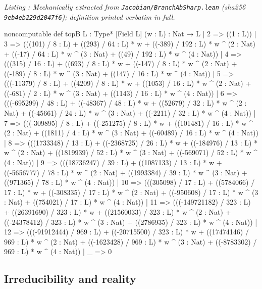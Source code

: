 \documentclass[a4paper,11pt]{article}
\newcounter{leanlisting}
\newenvironment{leanlisting}[2]{%
  \refstepcounter{leanlisting}\label{#2}%
  \begin{center}\textit{\small\color{inksecondary}Listing \theleanlisting: #1}\end{center}%
  \Verbatim[breaklines=true,breakanywhere=true,fontsize=\footnotesize,frame=single,framesep=4pt,rulecolor=\color{borderstrong},fillcolor=\color{bgsubtle}]%
}{%
  \endVerbatim%
}
\theoremstyle{jsplain}
\theoremstyle{jsdef}
\theoremstyle{jsrem}
\begin{document}
\begin{leanlisting}{Mechanically extracted from \texttt{Jacobian/BranchAbSharp.lean} (sha256 \texttt{9eb4eb229d2047f6}); definition printed verbatim in full.}{ab:lst:def-topb}
noncomputable def topB {L : Type*} [Field L] (w : L) : Nat → L
  | 2 => ((1 : L))
  | 3 => (((101) / 8 : L) + ((293) / 64 : L) * w + ((-389) / 192 : L) * w ^ (2 : Nat) + ((-17) / 64 : L) * w ^ (3 : Nat) + ((49) / 192 : L) * w ^ (4 : Nat))
  | 4 => (((315) / 16 : L) + ((693) / 8 : L) * w + ((-147) / 8 : L) * w ^ (2 : Nat) + ((-189) / 8 : L) * w ^ (3 : Nat) + ((147) / 16 : L) * w ^ (4 : Nat))
  | 5 => (((-11379) / 8 : L) + ((4209) / 8 : L) * w + ((1053) / 16 : L) * w ^ (2 : Nat) + ((-681) / 2 : L) * w ^ (3 : Nat) + ((1143) / 16 : L) * w ^ (4 : Nat))
  | 6 => (((-695299) / 48 : L) + ((-48367) / 48 : L) * w + ((52679) / 32 : L) * w ^ (2 : Nat) + ((-45661) / 24 : L) * w ^ (3 : Nat) + ((-2211) / 32 : L) * w ^ (4 : Nat))
  | 7 => (((-309895) / 8 : L) + ((-251275) / 8 : L) * w + ((101481) / 16 : L) * w ^ (2 : Nat) + ((1811) / 4 : L) * w ^ (3 : Nat) + ((-60489) / 16 : L) * w ^ (4 : Nat))
  | 8 => (((1733348) / 13 : L) + ((-2368725) / 26 : L) * w + ((-184976) / 13 : L) * w ^ (2 : Nat) + ((1819939) / 52 : L) * w ^ (3 : Nat) + ((-569071) / 52 : L) * w ^ (4 : Nat))
  | 9 => (((18736247) / 39 : L) + ((1087133) / 13 : L) * w + ((-5656777) / 78 : L) * w ^ (2 : Nat) + ((1993384) / 39 : L) * w ^ (3 : Nat) + ((971365) / 78 : L) * w ^ (4 : Nat))
  | 10 => (((305098) / 17 : L) + ((5784066) / 17 : L) * w + ((-308335) / 17 : L) * w ^ (2 : Nat) + ((-950608) / 17 : L) * w ^ (3 : Nat) + ((754021) / 17 : L) * w ^ (4 : Nat))
  | 11 => (((-149721182) / 323 : L) + ((26391690) / 323 : L) * w + ((21560033) / 323 : L) * w ^ (2 : Nat) + ((-24378412) / 323 : L) * w ^ (3 : Nat) + ((2786935) / 323 : L) * w ^ (4 : Nat))
  | 12 => (((-91912444) / 969 : L) + ((-20715500) / 323 : L) * w + ((17474146) / 969 : L) * w ^ (2 : Nat) + ((-1623428) / 969 : L) * w ^ (3 : Nat) + ((-8783302) / 969 : L) * w ^ (4 : Nat))
  | _ => 0
\end{leanlisting}

\subsection{Irreducibility and reality}
\end{document}
